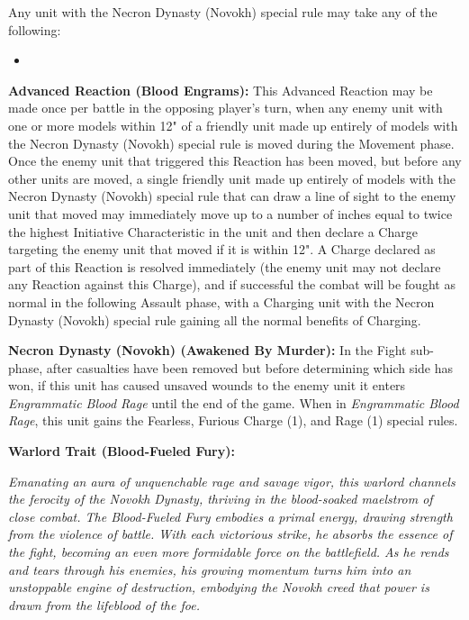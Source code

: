 \begin{multicols}{2}
Any unit with the Necron Dynasty (Novokh) special rule may take any of the following:
\begin{itemize}
	\item %
\end{itemize}

\textbf{Advanced Reaction (Blood Engrams):} This Advanced Reaction may be made once per battle in the opposing player’s turn, when any enemy unit with one or more models within 12" of a friendly unit made up entirely of models with the Necron Dynasty (Novokh) special rule is moved during the Movement phase. Once the enemy unit that triggered this Reaction has been moved, but before any other units are moved, a single friendly unit made up entirely of models with the Necron Dynasty (Novokh) special rule that can draw a line of sight to the enemy unit that moved may immediately move up to a number of inches equal to twice the highest Initiative Characteristic in the unit and then declare a Charge targeting the enemy unit that moved if it is within 12". A Charge declared as part of this Reaction is resolved immediately (the enemy unit may not declare any Reaction against this Charge), and if successful the combat will be fought as normal in the following Assault phase, with a Charging unit with the Necron Dynasty (Novokh) special rule gaining all the normal benefits of Charging.

\textbf{Necron Dynasty (Novokh) (Awakened By Murder):} In the Fight sub-phase, after casualties have been removed but before determining which side has won, if this unit has caused unsaved wounds to the enemy unit it enters \textit{Engrammatic Blood Rage} until the end of the game. When in \textit{Engrammatic Blood Rage}, this unit gains the Fearless, Furious Charge (1), and Rage (1) special rules.

\textbf{Warlord Trait (Blood-Fueled Fury):}

\textit{Emanating an aura of unquenchable rage and savage vigor, this warlord channels the ferocity of the Novokh Dynasty, thriving in the blood-soaked maelstrom of close combat. The Blood-Fueled Fury embodies a primal energy, drawing strength from the violence of battle. With each victorious strike, he absorbs the essence of the fight, becoming an even more formidable force on the battlefield. As he rends and tears through his enemies, his growing momentum turns him into an unstoppable engine of destruction, embodying the Novokh creed that power is drawn from the lifeblood of the foe.}


\end{multicols}
